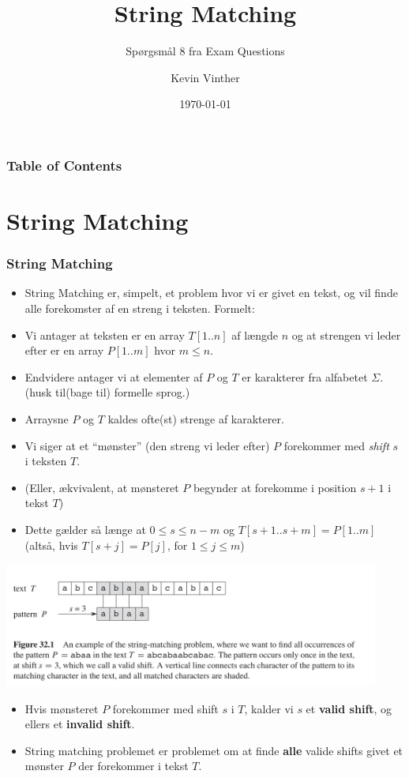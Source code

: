 \documentclass{beamer}
\title{String Matching}
\subtitle{Spørgsmål 8 fra Exam Questions}
\author{Kevin Vinther}
\date{\today}
\begin{document}
\begin{frame}
  \titlepage
\end{frame}

\begin{frame}[allowframebreaks]
  \frametitle{Table of Contents}
  \tableofcontents
\end{frame}

\section{String Matching}
\label{sec:stringmatch}

\begin{frame}[allowframebreaks]
  \frametitle{String Matching}
  \begin{itemize}
  \item String Matching er, simpelt, et problem hvor vi er givet en tekst, og vil finde alle forekomster af en streng i teksten. Formelt:
  \item Vi antager at teksten er en array $T[1..n]$ af længde $n$ og at strengen vi leder efter er en array $P[1..m]$ hvor $m \leq n$. 
  \item Endvidere antager vi at elementer af $P$ og $T$ er karakterer fra alfabetet $\Sigma$. (husk til(bage til) formelle sprog.)
  \item Arraysne $P$ og $T$ kaldes ofte(st) strenge af karakterer. 
  \item Vi siger at et ``mønster'' (den streng vi leder efter) $P$ forekommer med \textit{shift} $s$ i teksten $T$. 
  \item (Eller, ækvivalent, at mønsteret $P$ begynder at forekomme i position $s+1$ i tekst $T$) 
  \item Dette gælder så længe at $0 \leq s \leq n - m $ og $T[s+1 .. s+m] = P[1..m]$ (altså, hvis $T[s+j] = P[j]$, for $1 \leq j \leq m$)
  \end{itemize}

 \includegraphics[width=350pt]{main--string-matching-4d75.png} 

 \begin{itemize}
 \item Hvis mønsteret $P$ forekommer med shift $s$ i $T$, kalder vi $s$ et \textbf{valid shift}, og ellers et \textbf{invalid shift}.
 \item String matching problemet er problemet om at finde \textbf{alle} valide shifts givet et mønster $P$ der forekommer i tekst $T$.
 \end{itemize}
\end{frame}
\end{document}
